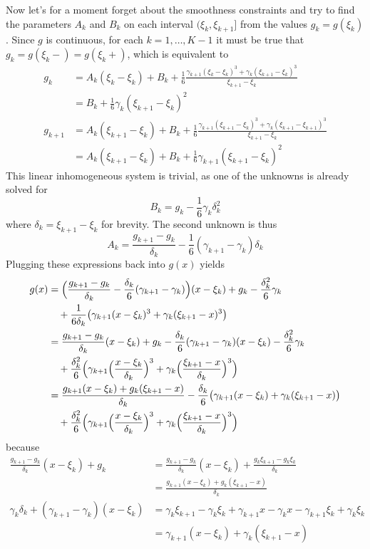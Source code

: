 \documentclass[a4paper]{article}
\begin{document}
Now let's for a moment forget about the smoothness constraints and try to find
the parameters $A_k$ and $B_k$ on each interval $(\xi_k,\xi_{k+1}]$ from the values
$g_k = g(\xi_k)$. Since $g$ is continuous, for each $k=1,\ldots,K-1$ it must be
true that $g_k = g(\xi_k-) = g(\xi_k+)$, which is equivalent to
\begin{align*}
g_k &= A_k(\xi_k - \xi_k) + B_k + \frac{1}{6}
	\frac{\gamma_{k+1}(\xi_k-\xi_k)^3+\gamma_k(\xi_{k+1}-\xi_k)^3}{\xi_{k+1}-\xi_k}\\
	&= B_k + \frac{1}{6} \gamma_k (\xi_{k+1}-\xi_k)^2\\
g_{k+1} &= A_k(\xi_{k+1}-\xi_k) + B_k + \frac{1}{6}
	\frac{\gamma_{k+1}(\xi_{k+1}-\xi_k)^3+\gamma_k(\xi_{k+1}-\xi_{k+1})^3}{\xi_{k+1}-\xi_k}\\
	&= A_k(\xi_{k+1}-\xi_k) + B_k + \frac{1}{6} \gamma_{k+1}(\xi_{k+1}-\xi_k)^2
\end{align*}
This linear inhomogeneous system is trivial, as one of the unknowns is already
solved for 
\[B_k = g_k - \frac{1}{6} \gamma_k \delta_k^2\]
where $\delta_k = \xi_{k+1}-\xi_k$ for brevity. The second unknown is thus
\[A_k = \frac{g_{k+1} - g_k}{\delta_k} - \frac{1}{6} (\gamma_{k+1}-\gamma_k) \delta_k\]
Plugging these expressions back into $g(x)$ yields
\begin{align*}
g(x) &= \Bigl(
		\frac{g_{k+1} - g_k}{\delta_k} - \frac{\delta_k}{6} (\gamma_{k+1}-\gamma_k)
	\Bigr) (x - \xi_k) + g_k - \frac{\delta_k^2}{6} \gamma_k\\
	&\quad + \frac{1}{6\delta_k} \bigl(\gamma_{k+1}(x-\xi_k)^3+\gamma_k(\xi_{k+1}-x)^3\bigr)\\
	&= \frac{g_{k+1} - g_k}{\delta_k}(x - \xi_k) + g_k
	- \frac{\delta_k}{6} (\gamma_{k+1}-\gamma_k)(x - \xi_k) - \frac{\delta_k^2}{6} \gamma_k\\
	&\quad + \frac{\delta_k^2}{6} \Bigl(\gamma_{k+1}\Bigl(\frac{x-\xi_k}{\delta_k}\Bigr)^3+\gamma_k\Bigl(\frac{\xi_{k+1}-x}{\delta_k}\Bigr)^3\Bigr)\\
	&= \frac{g_{k+1}(x - \xi_k) + g_k(\xi_{k+1} - x)}{\delta_k}
	- \frac{\delta_k}{6} \bigl( \gamma_{k+1} (x - \xi_k) + \gamma_k (\xi_{k+1}-x)\bigr)\\
	&\quad + \frac{\delta_k^2}{6} \Bigl(\gamma_{k+1}\Bigl(\frac{x-\xi_k}{\delta_k}\Bigr)^3+\gamma_k\Bigl(\frac{\xi_{k+1}-x}{\delta_k}\Bigr)^3\Bigr)\\
\end{align*}
because
\begin{align*}
\frac{g_{k+1} - g_k}{\delta_k}(x - \xi_k) + g_k
	&= \frac{g_{k+1} - g_k}{\delta_k}(x - \xi_k) + \frac{g_k\xi_{k+1} - g_k\xi_k}{\delta_k}\\
	&= \frac{g_{k+1}(x - \xi_k) + g_k(\xi_{k+1} - x)}{\delta_k}\\
\gamma_k \delta_k + (\gamma_{k+1}-\gamma_k) (x - \xi_k)
	& = \gamma_k \xi_{k+1} - \gamma_k \xi_k
		+ \gamma_{k+1} x - \gamma_k x
		- \gamma_{k+1}\xi_k + \gamma_k \xi_k \\
	&= \gamma_{k+1} (x - \xi_k) + \gamma_k (\xi_{k+1}-x) 
\end{align*}
\end{document}
